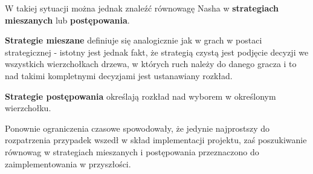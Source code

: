 \documentclass[polish]{standalone}
\begin{document}
W takiej sytuacji można jednak znaleźć równowagę Nasha w \textbf{strategiach mieszanych} lub \textbf{postępowania}.

\begin{definition}
\textbf{Strategie mieszane} definiuje się analogicznie jak w grach w postaci strategicznej - istotny jest jednak fakt,
że strategią czystą jest podjęcie decyzji we wszystkich wierzchołkach drzewa, w których ruch należy do danego gracza
i to nad takimi kompletnymi decyzjami jest ustanawiany rozkład.
\end{definition}

\begin{definition}
\textbf{Strategie postępowania} określają rozkład nad wyborem w określonym wierzchołku.
\end{definition}

Ponownie ograniczenia czasowe spowodowały, że jedynie najprostszy do rozpatrzenia przypadek wszedł w skład implementacji
projektu, zaś poszukiwanie równowag w strategiach mieszanych i postępowania przeznaczono do zaimplementowania
w przyszłości.
\end{document}
